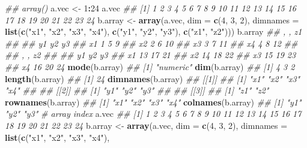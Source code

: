 \documentclass[
]{book}
\newenvironment{Shaded}{\begin{snugshade}}{\end{snugshade}}
\newcommand{\CommentTok}[1]{\textcolor[rgb]{0.56,0.35,0.01}{\textit{#1}}}
\newcommand{\DataTypeTok}[1]{\textcolor[rgb]{0.13,0.29,0.53}{#1}}
\newcommand{\DecValTok}[1]{\textcolor[rgb]{0.00,0.00,0.81}{#1}}
\newcommand{\KeywordTok}[1]{\textcolor[rgb]{0.13,0.29,0.53}{\textbf{#1}}}
\newcommand{\NormalTok}[1]{#1}
\newcommand{\OperatorTok}[1]{\textcolor[rgb]{0.81,0.36,0.00}{\textbf{#1}}}
\newcommand{\StringTok}[1]{\textcolor[rgb]{0.31,0.60,0.02}{#1}}
\begin{document}
\begin{Shaded}
\begin{Highlighting}[]
\CommentTok{\#\# array()}
\NormalTok{a.vec \textless{}{-}}\StringTok{ }\DecValTok{1}\OperatorTok{:}\DecValTok{24}
\NormalTok{a.vec}
\CommentTok{\#\#  [1]  1  2  3  4  5  6  7  8  9 10 11 12 13 14 15 16 17 18 19 20 21 22 23 24}
\NormalTok{b.array \textless{}{-}}\StringTok{ }\KeywordTok{array}\NormalTok{(a.vec, }\DataTypeTok{dim =} \KeywordTok{c}\NormalTok{(}\DecValTok{4}\NormalTok{, }\DecValTok{3}\NormalTok{, }\DecValTok{2}\NormalTok{),}
                 \DataTypeTok{dimnames =} \KeywordTok{list}\NormalTok{(}\KeywordTok{c}\NormalTok{(}\StringTok{"x1"}\NormalTok{, }\StringTok{"x2"}\NormalTok{, }\StringTok{"x3"}\NormalTok{, }\StringTok{"x4"}\NormalTok{),}
                                 \KeywordTok{c}\NormalTok{(}\StringTok{"y1"}\NormalTok{, }\StringTok{"y2"}\NormalTok{, }\StringTok{"y3"}\NormalTok{),}
                                 \KeywordTok{c}\NormalTok{(}\StringTok{"z1"}\NormalTok{, }\StringTok{"z2"}\NormalTok{)))}
\NormalTok{b.array}
\CommentTok{\#\# , , z1}
\CommentTok{\#\# }
\CommentTok{\#\#    y1 y2 y3}
\CommentTok{\#\# x1  1  5  9}
\CommentTok{\#\# x2  2  6 10}
\CommentTok{\#\# x3  3  7 11}
\CommentTok{\#\# x4  4  8 12}
\CommentTok{\#\# }
\CommentTok{\#\# , , z2}
\CommentTok{\#\# }
\CommentTok{\#\#    y1 y2 y3}
\CommentTok{\#\# x1 13 17 21}
\CommentTok{\#\# x2 14 18 22}
\CommentTok{\#\# x3 15 19 23}
\CommentTok{\#\# x4 16 20 24}
\KeywordTok{mode}\NormalTok{(b.array)}
\CommentTok{\#\# [1] "numeric"}
\KeywordTok{dim}\NormalTok{(b.array)}
\CommentTok{\#\# [1] 4 3 2}
\KeywordTok{length}\NormalTok{(b.array)}
\CommentTok{\#\# [1] 24}
\KeywordTok{dimnames}\NormalTok{(b.array)}
\CommentTok{\#\# [[1]]}
\CommentTok{\#\# [1] "x1" "x2" "x3" "x4"}
\CommentTok{\#\# }
\CommentTok{\#\# [[2]]}
\CommentTok{\#\# [1] "y1" "y2" "y3"}
\CommentTok{\#\# }
\CommentTok{\#\# [[3]]}
\CommentTok{\#\# [1] "z1" "z2"}
\KeywordTok{rownames}\NormalTok{(b.array)}
\CommentTok{\#\# [1] "x1" "x2" "x3" "x4"}
\KeywordTok{colnames}\NormalTok{(b.array)}
\CommentTok{\#\# [1] "y1" "y2" "y3"}
\CommentTok{\# array index}
\NormalTok{a.vec}
\CommentTok{\#\#  [1]  1  2  3  4  5  6  7  8  9 10 11 12 13 14 15 16 17 18 19 20 21 22 23 24}
\NormalTok{b.array \textless{}{-}}\StringTok{ }\KeywordTok{array}\NormalTok{(a.vec, }\DataTypeTok{dim =} \KeywordTok{c}\NormalTok{(}\DecValTok{4}\NormalTok{, }\DecValTok{3}\NormalTok{, }\DecValTok{2}\NormalTok{),}
                 \DataTypeTok{dimnames =} \KeywordTok{list}\NormalTok{(}\KeywordTok{c}\NormalTok{(}\StringTok{"x1"}\NormalTok{, }\StringTok{"x2"}\NormalTok{, }\StringTok{"x3"}\NormalTok{, }\StringTok{"x4"}\NormalTok{),}

\end{Highlighting}
\end{Shaded}
\end{document}
